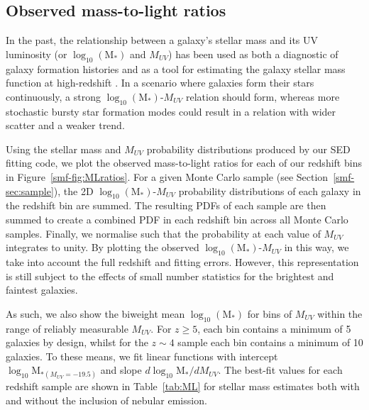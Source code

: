 \subsection{Observed mass-to-light ratios}\label{subsmf-sec:masslightratios}
In the past, the relationship between a galaxy's stellar mass and its UV luminosity (or $\log_{10} (\text{M}_{*})$ and $M_{UV}$) has been used as both a diagnostic of galaxy formation histories \citep{2009ApJ...697.1493S} and as a tool for estimating the galaxy stellar mass function at high-redshift \citep{Gonzalez:2011dn}. In a scenario where galaxies form their stars continuously, a strong $\log_{10} (\text{M}_{*})$-$M_{UV}$ relation should form, whereas more stochastic bursty star formation modes could result in a relation with wider scatter and a weaker trend.

Using the stellar mass and $M_{UV}$ probability distributions produced by our SED fitting code, we plot the observed mass-to-light ratios for each of our redshift bins in Figure~\ref{smf-fig:MLratios}. For a given  Monte Carlo sample (see Section~\ref{smf-sec:sample}), the 2D $\log_{10} (\text{M}_{*})$-$M_{UV}$ probability distributions of each galaxy in the redshift bin are summed. The resulting PDFs of each sample are then summed to create a combined PDF in each redshift bin across all Monte Carlo samples. Finally, we normalise such that the probability at each value of $M_{UV}$ integrates to unity. By plotting the observed $\log_{10} (\text{M}_{*})$-$M_{UV}$ in this way, we take into account the full redshift and fitting errors. However, this representation is still subject to the effects of small number statistics for the brightest and faintest galaxies. 

As such, we also show the biweight mean $\log_{10}(\text{M}_{*})$ for bins of $M_{UV}$ within the range of reliably measurable $M_{UV}$. For $z \geq 5$, each bin contains a minimum of 5 galaxies by design, whilst for the $z \sim 4$ sample each bin contains a minimum of 10 galaxies. To these means, we fit linear functions with intercept $\log_{10}\text{M}_{*(M_{UV}=-19.5)}$ and slope $d\log_{10}\text{M}_{*}/dM_{UV}$. The best-fit values for each redshift sample are shown in Table~\ref{tab:ML} for stellar mass estimates both with and without the inclusion of nebular emission. 

